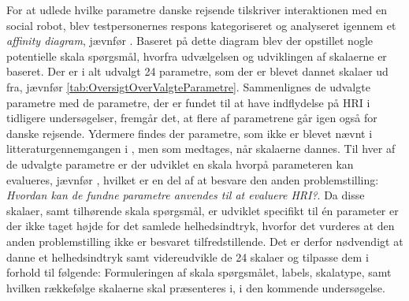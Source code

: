\noindent
%
For at udlede hvilke parametre danske rejsende tilskriver interaktionen med en social robot, blev testpersonernes respons kategoriseret og analyseret igennem et \textit{affinity diagram}, jævnfør . Baseret på dette diagram blev der opstillet nogle potentielle skala spørgsmål, hvorfra udvælgelsen og udviklingen af skalaerne er baseret. Der er i alt udvalgt 24 parametre, som der er blevet dannet skalaer ud fra, jævnfør \autoref{tab:OversigtOverValgteParametre}. Sammenlignes de udvalgte parametre med de parametre, der er fundet til at have indflydelse på HRI i tidligere undersøgelser, fremgår det, at flere af parametrene går igen også for danske rejsende. Ydermere findes der parametre, som ikke er blevet nævnt i litteraturgennemgangen i , men som medtages, når skalaerne dannes.\blankline
%
Til hver af de udvalgte parametre er der udviklet en skala hvorpå parameteren kan evalueres, jævnfør , hvilket er en del af at besvare den anden problemstilling: \textit{Hvordan kan de fundne parametre anvendes til at evaluere HRI?}. Da disse skalaer, samt tilhørende skala spørgsmål, er udviklet specifikt til én parameter er der ikke taget højde for det samlede helhedsindtryk, hvorfor det vurderes at den anden problemstilling ikke er besvaret tilfredstillende. Det er derfor nødvendigt at danne et helhedsindtryk samt videreudvikle de 24 skalaer og tilpasse dem i forhold til følgende: Formuleringen af skala spørgsmålet, labels, skalatype, samt hvilken rækkefølge skalaerne skal præsenteres i, i den kommende undersøgelse.    





